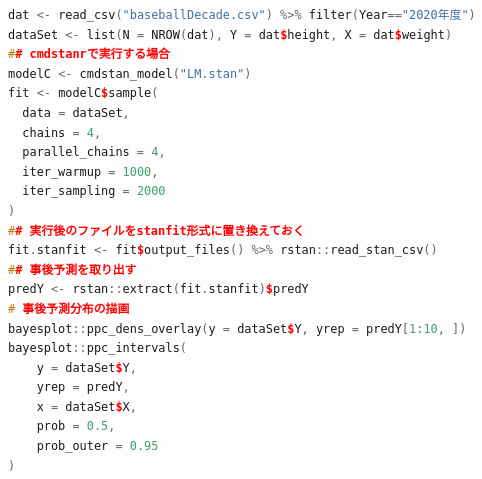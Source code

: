 \begin{lstlisting}[language=c++,label={code:24_01},caption={一般線形モデルを実行するコード}]
dat <- read_csv("baseballDecade.csv") %>% filter(Year=="2020年度")
dataSet <- list(N = NROW(dat), Y = dat$height, X = dat$weight)
## cmdstanrで実行する場合
modelC <- cmdstan_model("LM.stan")
fit <- modelC$sample(
  data = dataSet,
  chains = 4,
  parallel_chains = 4,
  iter_warmup = 1000,
  iter_sampling = 2000
)
## 実行後のファイルをstanfit形式に置き換えておく
fit.stanfit <- fit$output_files() %>% rstan::read_stan_csv()
## 事後予測を取り出す
predY <- rstan::extract(fit.stanfit)$predY
# 事後予測分布の描画
bayesplot::ppc_dens_overlay(y = dataSet$Y, yrep = predY[1:10, ])
bayesplot::ppc_intervals(
    y = dataSet$Y,
    yrep = predY,
    x = dataSet$X,
    prob = 0.5,
    prob_outer = 0.95
)
\end{lstlisting}
